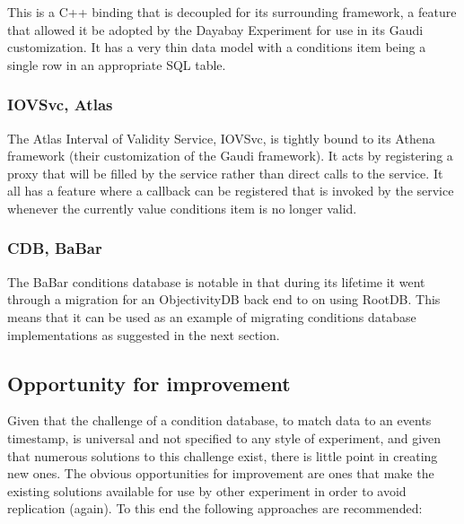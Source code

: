 This is a C++ binding that is decoupled for its surrounding framework, a feature that allowed it be adopted by the Dayabay Experiment for use in its Gaudi customization. It has a very thin data model with a conditions item being a single row in an appropriate SQL table.

\subsubsection{IOVSvc, Atlas}

The Atlas Interval of Validity Service, IOVSvc, is tightly bound to its Athena framework (their customization of the Gaudi framework). It acts by registering a proxy that will be filled by the service rather than direct calls to the service. It all has a feature where a callback can be registered that is invoked by the service whenever the currently value conditions item is no longer valid.

\subsubsection{CDB, BaBar}

The BaBar conditions database is notable in that during its lifetime it went through a migration for an ObjectivityDB back end to on using RootDB. This means that it can be used as an example of migrating conditions database implementations as suggested in the next section.


\subsection{Opportunity for improvement}

Given that the challenge of a condition database, to match data to an events timestamp, is universal and not specified to any style of experiment, and given that numerous solutions to this challenge exist, there is little point in creating new ones. The obvious opportunities for improvement are ones that make the existing solutions available for use by other experiment in order to avoid replication (again). To this end the following approaches are recommended:

